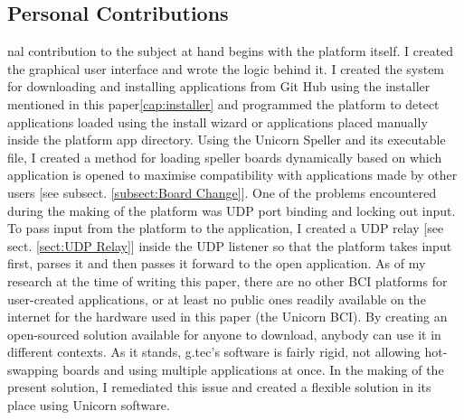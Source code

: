 \subsection{Personal Contributions}nal contribution to the subject at hand begins with the platform itself. I created the graphical user interface and wrote the logic behind it. I created the system for downloading and installing applications from Git Hub using the installer mentioned in this paper\ref{cap:installer} and programmed the platform to detect applications loaded using the install wizard or applications placed manually inside the platform app directory.
\vspace{\baselineskip}\newline
Using the Unicorn Speller and its executable file, I created a method for loading speller boards dynamically based on which application is opened to maximise compatibility with applications made by other users [see subsect. \ref{subsect:Board Change}].
\vspace{\baselineskip}\newline
One of the problems encountered during the making of the platform was UDP port binding and locking out input. To pass input from the platform to the application, I created a UDP relay [see sect. \ref{sect:UDP Relay}] inside the UDP listener so that the platform takes input first, parses it and then passes it forward to the open application.
\vspace{\baselineskip}\newline
As of my research at the time of writing this paper, there are no other BCI platforms for user-created applications, or at least no public ones readily available on the internet for the hardware used in this paper (the Unicorn BCI). By creating an open-sourced solution available for anyone to download, anybody can use it in different contexts. As it stands, g.tec's software is fairly rigid, not allowing hot-swapping boards and using multiple applications at once. In the making of the present solution, I remediated this issue and created a flexible solution in its place using Unicorn software.

